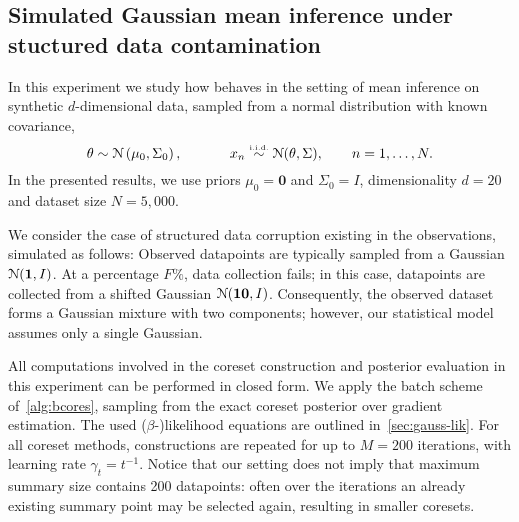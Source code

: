 \subsection{Simulated Gaussian mean inference under stuctured data contamination}
\label{subsec:gauss-expt}

In this experiment we study how \bcores{} behaves in the setting of mean inference on synthetic $d$-dimensional data, sampled \iid from a normal distribution with known covariance,
\[
\theta \sim \distNorm\left(\mu_0, \Sigma_0\right),
\qquad 
\;\;\;\;\;
x_n \distiid \distNorm(\theta, \Sigma),
\qquad
n = 1, \ldots, N.
\label{eq:mvn-expt}
\]
In the presented results, we use priors $\mu_0=\mathbf{0}$ and $\Sigma_0=I$,  dimensionality $d=20$ and dataset size $N=5,000$.
 
We consider the case of structured data corruption existing in the observations, simulated as follows: Observed datapoints are typically sampled from a Gaussian $ \mathcal{N}(\mathbf{1}, I)$. At a percentage $F\%$,  data collection fails; in this case, datapoints are collected from a shifted Gaussian $ \mathcal{N}(\mathbf{10}, I)$. Consequently, the observed dataset forms a Gaussian mixture with two components; however, our statistical model assumes only a single Gaussian.

All computations involved in the coreset construction and posterior evaluation in this experiment can be performed in closed form. We apply the batch scheme of~\cref{alg:bcores}, sampling from the exact coreset posterior over gradient estimation. The used \mbox{($\beta$-)}likelihood equations are outlined in~\cref{sec:gauss-lik}. For all coreset methods, constructions are repeated for up to $M=200$ iterations, with learning rate $\gamma_t = t^{-1}$. Notice that our setting does not imply that maximum summary size contains 200 datapoints: often over the iterations an already existing summary point may be selected again, resulting in smaller coresets.

